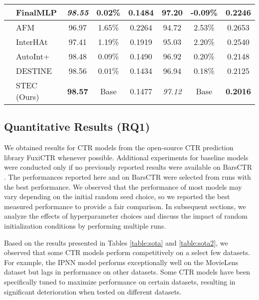 \documentclass{article}
\begin{document}
\begin{table}[t]
{\begin{tabular}{llcccccc}
                              & FinalMLP               & \textit{98.55} & 0.02\%  & 0.1484    & \textbf{97.20}  & -0.09\% & 0.2246     \\ \hline
{}   & AFM                    & 96.97 & 1.65\%  & 0.2264    & 94.72  & 2.53\%  & 0.2653     \\ 
                              & InterHAt               & 97.41 & 1.19\%  & 0.1919    & 95.03  & 2.20\%  & 0.2540     \\
                              & AutoInt+               & 98.48 & 0.09\%  & 0.1490    & 96.92  & 0.20\%  & 0.2148     \\
                              & DESTINE                & 98.56 & 0.01\%  & 0.1434    & 96.94  & 0.18\%  & 0.2125     \\
                              & STEC (Ours)            & \textbf{98.57} & Base    & 0.1477    & \textit{97.12}  & Base    & \textbf{0.2016}     \\ \hline

\end{tabular}}
\end{table}

\subsection{Quantitative Results (RQ1)}

We obtained results for CTR models from the open-source CTR prediction library FuxiCTR whenever possible. Additional experiments for baseline models were conducted only if no previously reported results were available on BarsCTR \cite{barsctr}. The performances reported here and on BarsCTR were selected from runs with the best performance. We observed that the performance of most models may vary depending on the initial random seed choice, so we reported the best measured performance to provide a fair comparison. In subsequent sections, we analyze the effects of hyperparameter choices and discuss the impact of random initialization conditions by performing multiple runs.

Based on the results presented in Tables \ref{table:sota} and \ref{table:sota2}, we observed that some CTR models perform competitively on a select few datasets. For example, the IPNN model performs exceptionally well on the MovieLens dataset but lags in performance on other datasets. Some CTR models have been specifically tuned to maximize performance on certain datasets, resulting in significant deterioration when tested on different datasets.
\end{document}
